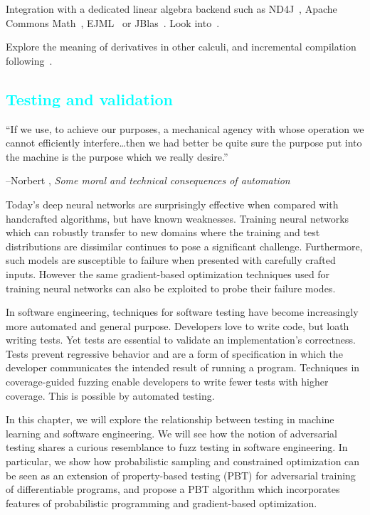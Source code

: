 \documentclass[12pt,initial,twoside,maitrise]{dms}
\newcommand{\medium}[1]{\textcolor{cyan}{#1}}
\numberwithin{equation}{section}
\numberwithin{table}{chapter}
\numberwithin{figure}{chapter}
\begin{document}
Integration with a dedicated linear algebra backend such as ND4J~\citep{team2016nd4j}, Apache Commons Math~\citep{developers2012apache}, EJML~\citep{abeles2010efficient} or JBlas~\citep{braun2011jblas}. Look into~\cite{makwana2018numlin}.

Explore the meaning of derivatives in other calculi, and incremental compilation following~\citet{ehrhard2003differential, chen2012type, cai2014theory, kelly2016evolving}.

\medium{\chapter{Testing and validation}\label{ch:difftest}}

\setlength{\epigraphwidth}{0.80\textwidth}
\epigraph{``If we use, to achieve our purposes, a mechanical agency with whose operation we cannot efficiently interfere\ldots then we had better be quite sure the purpose put into the machine is the purpose which we really desire.''}{\begin{flushright}--Norbert \citet{wiener1960some}, \textit{Some moral and technical consequences of automation}~\end{flushright}}

Today's deep neural networks are surprisingly effective when compared with handcrafted algorithms, but have known weaknesses. Training neural networks which can robustly transfer to new domains where the training and test distributions are dissimilar continues to pose a significant challenge. Furthermore, such models are susceptible to failure when presented with carefully crafted inputs. However the same gradient-based optimization techniques used for training neural networks can also be exploited to probe their failure modes.

In software engineering, techniques for software testing have become increasingly more automated and general purpose. Developers love to write code, but loath writing tests. Yet tests are essential to validate an implementation's correctness. Tests prevent regressive behavior and are a form of specification in which the developer communicates the intended result of running a program. Techniques in coverage-guided fuzzing enable developers to write fewer tests with higher coverage. This is possible by automated testing.

In this chapter, we will explore the relationship between testing in machine learning and software engineering. We will see how the notion of adversarial testing shares a curious resemblance to fuzz testing in software engineering. In particular, we show how probabilistic sampling and constrained optimization can be seen as an extension of property-based testing (PBT) for adversarial training of differentiable programs, and propose a PBT algorithm which incorporates features of probabilistic programming and gradient-based optimization.
\end{document}
